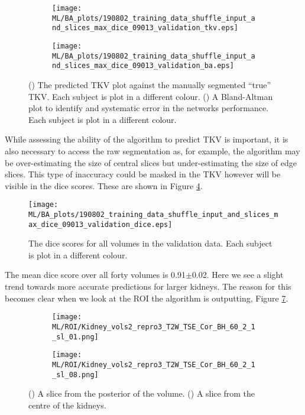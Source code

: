 \begin{figure}[H]
	\centering
	\begin{subfigure}[c]{0.47\textwidth}
		\centering
		\texttt{[image: ML/BA\_plots/190802\_training\_data\_shuffle\_input\_and\_slices\_max\_dice\_09013\_validation\_tkv.eps]}
		\caption{}
		\label{fig:ml_validation}
	\end{subfigure}
	\hfill
	\begin{subfigure}[c]{0.47\textwidth}
		\centering
		\texttt{[image: ML/BA\_plots/190802\_training\_data\_shuffle\_input\_and\_slices\_max\_dice\_09013\_validation\_ba.eps]}
		\caption{}
		\label{fig:ml_ba_validation}
	\end{subfigure}
	\caption{() The predicted \ac{TKV} plot against the manually segmented ``true'' \ac{TKV}. Each subject is plot in a different colour. () A Bland-Altman plot to identify and systematic error in the networks performance. Each subject is plot in a different colour.}
	\label{fig:ml_validation_tkv}
\end{figure}

While assessing the ability of the algorithm to predict \ac{TKV} is important, it is also necessary to access the raw segmentation as, for example, the algorithm may be over-estimating the size of central slices but under-estimating the size of edge slices. This type of inaccuracy could be masked in the \ac{TKV} however will be visible in the dice scores. These are shown in Figure \ref{fig:ml_validation_dice}.

\begin{figure}[H]
	\centering
	\texttt{[image: ML/BA\_plots/190802\_training\_data\_shuffle\_input\_and\_slices\_max\_dice\_09013\_validation\_dice.eps]}
	\caption{The dice scores for all volumes in the validation data. Each subject is plot in a different colour.}
	\label{fig:ml_validation_dice}
\end{figure}

The mean dice score over all forty volumes is 0.91$\pm$0.02. Here we see a slight trend towards more accurate predictions for larger kidneys. The reason for this becomes clear when we look at the \ac{ROI} the algorithm is outputting, Figure \ref{fig:ml_roi}.

\begin{figure}[H]
	\centering
	\begin{subfigure}[c]{0.47\textwidth}
		\centering
		\texttt{[image: ML/ROI/Kidney\_vols2\_repro3\_T2W\_TSE\_Cor\_BH\_60\_2\_1\_sl\_01.png]}
		\caption{}
		\label{fig:ml_roi_outside}
	\end{subfigure}
	\hfill
	\begin{subfigure}[c]{0.47\textwidth}
		\centering
		\texttt{[image: ML/ROI/Kidney\_vols2\_repro3\_T2W\_TSE\_Cor\_BH\_60\_2\_1\_sl\_08.png]}
		\caption{}
		\label{fig:ml_roi_inside}
	\end{subfigure}
	\caption{() A slice from the posterior of the volume. () A slice from the centre of the kidneys.}
	\label{fig:ml_roi}
\end{figure}


